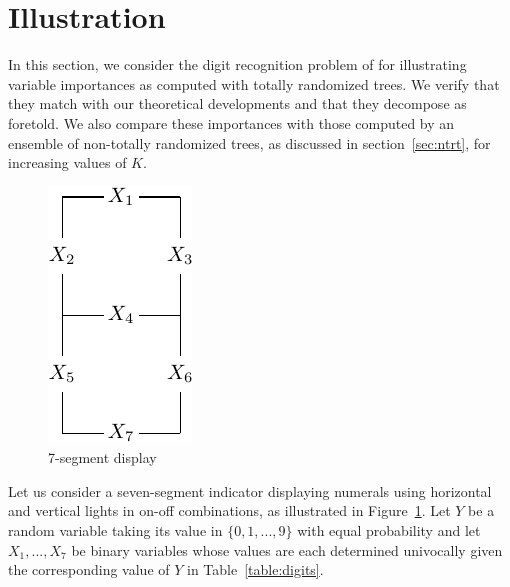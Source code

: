 \section{Illustration}
\label{sec:6:illustration}

In this section, we consider the digit recognition
problem of \citep{breiman:1984} for illustrating variable importances as
computed with totally randomized trees. We verify that they match with our
theoretical developments and that they decompose as foretold. We also compare
these importances with those computed by an ensemble of non-totally randomized
trees, as discussed in section~\ref{sec:ntrt}, for increasing values of $K$.

\begin{figure}
    \centering
    \includegraphics[]{figures/ch6_led.pdf}
    \caption{7-segment display}
    \label{fig:digits}
\end{figure}

Let us consider a seven-segment indicator displaying numerals using horizontal and
vertical lights in on-off combinations, as illustrated in
Figure~\ref{fig:digits}. Let $Y$ be a random variable taking its value in $\{0, 1,
..., 9\}$ with equal probability and  let $X_1, ..., X_7$ be binary variables
whose values are each determined univocally given the corresponding value of $Y$
in Table~\ref{table:digits}.

